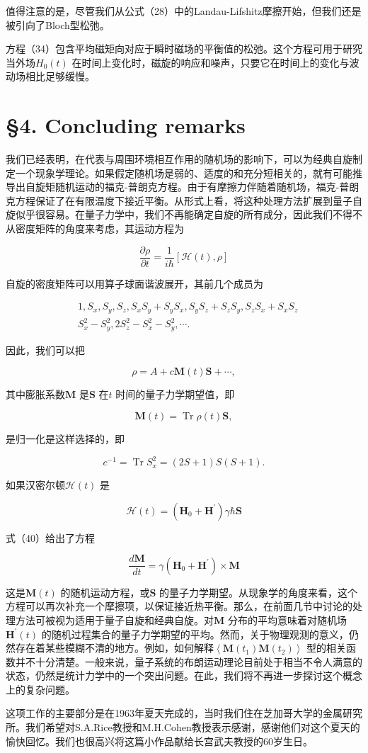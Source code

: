 \documentclass[10pt]{article}
\begin{document}
值得注意的是，尽管我们从公式（28）中的Landau-Lifshitz摩擦开始，但我们还是被引向了Bloch型松弛。

方程（34）包含平均磁矩向对应于瞬时磁场的平衡值的松弛。这个方程可用于研究当外场\(H_{0}(t)\) 在时间上变化时，磁旋的响应和噪声，只要它在时间上的变化与波动场相比足够缓慢。

\section{§4. Concluding remarks} 
我们已经表明，在代表与周围环境相互作用的随机场的影响下，可以为经典自旋制定一个现象学理论。如果假定随机场是弱的、适度的和充分短相关的，就有可能推导出自旋矩随机运动的福克-普朗克方程。由于有摩擦力伴随着随机场，福克-普朗克方程保证了在有限温度下接近平衡。从形式上看，将这种处理方法扩展到量子自旋似乎很容易。在量子力学中，我们不再能确定自旋的所有成分，因此我们不得不从密度矩阵的角度来考虑，其运动方程为

\[
\frac{\partial \rho}{\partial t}=\frac{1}{i \hbar}[\mathcal{H}(t), \rho]
\] 

自旋的密度矩阵可以用算子球面谐波展开，其前几个成员为

\[
\begin{aligned}
& 1, S_{x}, S_{y}, S_{z}, S_{x} S_{y}+S_{y} S_{x}, S_{y} S_{z}+S_{z} S_{y}, S_{z} S_{x}+S_{x} S_{z} \\
& S_{x}^{2}-S_{y}^{2}, 2 S_{z}^{2}-S_{x}^{2}-S_{y}^{2}, \cdots .
\end{aligned}
\] 

因此，我们可以把

\[
\rho=A+c \boldsymbol{M}(t) \boldsymbol{S}+\cdots,
\] 

其中膨胀系数\(\boldsymbol{M}\) 是\(\boldsymbol{S}\) 在\(t\) 时间的量子力学期望值，即

\[
\boldsymbol{M}(t)=\operatorname{Tr} \rho(t) \mathbf{S},
\] 

是归一化是这样选择的，即

\[
c^{-1}=\operatorname{Tr} S_{x}^{2}=(2 S+1) S(S+1) .
\] 

如果汉密尔顿\(\mathcal{H}(t)\) 是

\[
\mathscr{H}(t)=\left(\boldsymbol{H}_{0}+\boldsymbol{H}^{\prime}\right) \gamma \hbar \boldsymbol{S}
\] 

式（40）给出了方程

\[
\frac{d \boldsymbol{M}}{d t}=\gamma\left(\boldsymbol{H}_{0}+\boldsymbol{H}^{\prime}\right) \times \boldsymbol{M}
\] 

这是\(\boldsymbol{M}(t)\) 的随机运动方程，或\(\mathbf{S}\) 的量子力学期望。从现象学的角度来看，这个方程可以再次补充一个摩擦项，以保证接近热平衡。那么，在前面几节中讨论的处理方法可被视为适用于量子自旋和经典自旋。对\(\boldsymbol{M}\) 分布的平均意味着对随机场\(\boldsymbol{H}^{\prime}(t)\) 的随机过程集合的量子力学期望的平均。然而，关于物理观测的意义，仍然存在着某些模糊不清的地方。例如，如何解释\(\left\langle\boldsymbol{M}\left(t_{1}\right) \boldsymbol{M}\left(t_{2}\right)\right\rangle\) 型的相关函数并不十分清楚。一般来说，量子系统的布朗运动理论目前处于相当不令人满意的状态，仍然是统计力学中的一个突出问题。在此，我们将不再进一步探讨这个概念上的复杂问题。

这项工作的主要部分是在1963年夏天完成的，当时我们住在芝加哥大学的金属研究所。我们希望对S.A.Rice教授和M.H.Cohen教授表示感谢，感谢他们对这个夏天的愉快回忆。我们也很高兴将这篇小作品献给长宫武夫教授的60岁生日。
\end{document}
